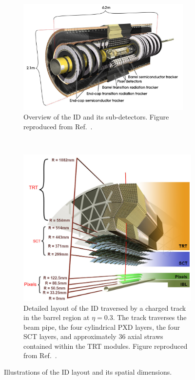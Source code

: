 \begin{figure}[htbp]
\begin{subfigure}{1.\textwidth}
  \centering
  \includegraphics[width=0.95\textwidth]{figures/experiment/innerdetector_full.jpg}
  \caption{Overview of the ID and its sub-detectors. Figure reproduced from Ref.~\cite{ATLAS2008}.}
  \label{fig:innerdetector-full}
\end{subfigure}
\\
\begin{subfigure}{1.\textwidth}
  \centering
  \includegraphics[width=.95\textwidth]{figures/experiment/innerdetector_detail.png}
  \caption{Detailed layout of the ID traversed by a charged track in the barrel region at \(\eta = 0.3\). The track traverses the beam pipe, the four cylindrical PXD layers, the four SCT layers, and approximately 36 axial straws contained within the TRT modules. Figure reproduced from Ref.~\cite{Potamianos:2016ptf}.}
  \label{fig:innerdetector-detail}
\end{subfigure}
    \caption{Illustrations of the ID layout and its spatial dimensions.}
    \label{fig:innerdetector}
\end{figure}

